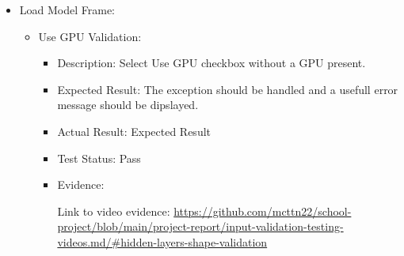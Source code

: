 \documentclass[./project-report/src/latex/project-report.tex]{subfiles}
\begin{document}
\begin{itemize}
    \item Load Model Frame:
    \begin{itemize}
        \item Use GPU Validation:
            \begin{itemize}
            \item Description: Select Use GPU checkbox without a GPU present.
            \item Expected Result: The exception should be handled and a usefull error message should be dipslayed.
            \item Actual Result: Expected Result
            \item Test Status: Pass
            \item Evidence:
                \begin{figure}[h!]
                \centering
                \end{figure}

                Link to video evidence: \url{https://github.com/mcttn22/school-project/blob/main/project-report/input-validation-testing-videos.md/#hidden-layers-shape-validation}
            \end{itemize}
    \end{itemize}

    \pagebreak


\end{itemize}
\end{document}
